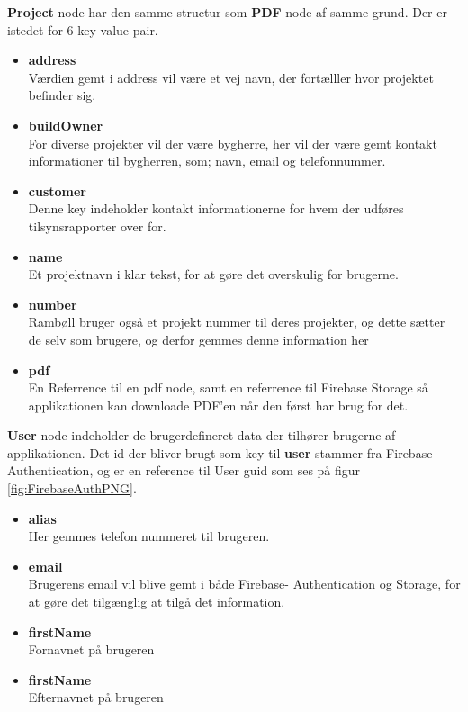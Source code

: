 	\textbf{Project} node har den samme structur som \textbf{PDF} node af samme grund. Der er istedet for 6 key-value-pair. 
	\begin{itemize}
		\item  \textbf{address}\\
		Værdien gemt i address vil være et vej navn, der fortælller hvor projektet befinder sig.\\
		\item  \textbf{buildOwner}\\
		For diverse projekter vil der være bygherre, her vil der være gemt kontakt informationer til bygherren, som; navn, email og telefonnummer. \\ 
		\item  \textbf{customer}\\
		Denne key indeholder kontakt informationerne for hvem der udføres tilsynsrapporter over for.\\
		\item  \textbf{name}\\
		Et projektnavn i klar tekst, for at gøre det overskulig for brugerne.\\
		\item  \textbf{number}\\
		Rambøll bruger også et projekt nummer til deres projekter, og dette sætter de selv som brugere, og derfor gemmes denne information her\\
		\item  \textbf{pdf}\\
		En Referrence til en pdf node, samt en referrence til Firebase Storage så applikationen kan  downloade PDF'en når den først har brug for det.\\
	\end{itemize}

\textbf{User} node indeholder de brugerdefineret data der tilhører brugerne af applikationen. Det id der bliver brugt som key til \textbf{user} stammer fra Firebase Authentication, og er en reference til User guid som ses på figur \ref{fig:FirebaseAuthPNG}. 
\begin{itemize}
	\item \textbf{alias} \\
	Her gemmes telefon nummeret til brugeren. \\
	\item \textbf{email} \\
	Brugerens email vil blive gemt i både Firebase- Authentication og Storage, for at gøre det tilgænglig at tilgå det information.\\
	\item \textbf{firstName} \\
	Fornavnet på brugeren\\
	\item \textbf{firstName} \\
	Efternavnet på brugeren\\

\end{itemize}

\clearpage

